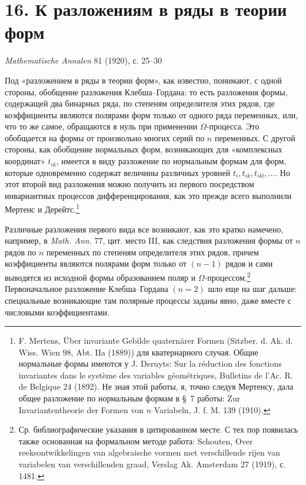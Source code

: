 \documentclass[11pt]{article}
\begin{document}

\section*{16. К разложениям в ряды в теории форм}
\begin{center}
\emph{Mathematische Annalen} 81 (1920), с. 25--30
\end{center}

Под «разложением в ряды в теории форм», как известно, понимают, с одной стороны, обобщение разложения Клебша--Гордана: то есть разложения формы, содержащей два бинарных ряда, по степеням определителя этих рядов, где коэффициенты являются полярами форм только от одного ряда переменных, или, что то же самое, обращаются в нуль при применении \(\Omega\)-процесса. Это обобщается на формы от произвольно многих серий по \(n\) переменных. С другой стороны, как обобщение нормальных форм, возникающих для «комплексных координат» \(t_{ik}\), имеется в виду разложение по нормальным формам для форм, которые одновременно содержат величины различных уровней \(t_i,t_{ik},t_{ikl},\ldots\). Но этот второй вид разложения можно получить из первого посредством инвариантных процессов дифференцирования, как это прежде всего выполнили Мертенс и Дерейтс.\footnote{F. Mertens, Über invariante Gebilde quaternärer Formen (Sitzber. d. Ak. d. Wiss. Wien 98, Abt. IIa (1889)) для кватернарного случая. Общие нормальные формы имеются у J. Deruyts: Sur la réduction des fonctions invariantes dans le système des variables géométriques, Bulletins de l'Ac. R. de Belgique 24 (1892). Не зная этой работы, я, точно следуя Мертенсу, дала общее разложение по нормальным формам в \S~7 работы: Zur Invariantentheorie der Formen von \(n\) Variabeln, J. f. M. 139 (1910).}

Различные разложения первого вида все возникают, как это кратко намечено, например, в \emph{Math. Ann.} 77, цит. место III, как следствия разложения формы от \(n\) рядов по \(n\) переменных по степеням определителя этих рядов, причем коэффициенты являются полярами форм только от \((n-1)\) рядов и сами выводятся из исходной формы образованием поляр и \(\Omega\)-процессом.\footnote{Ср. библиографические указания в цитированном месте. С тех пор появилась также основанная на формальном методе работа: Schouten, Over reeksontwikkelingen van algebraische vormen met verschillende rijen van variabelen van verschillenden graad, Verslag Ak. Amsterdam 27 (1919), с. 1481.} Первоначальное разложение Клебша--Гордана \((n=2)\) шло еще на шаг дальше: специальные возникающие там полярные процессы заданы явно, даже вместе с числовыми коэффициентами.
\end{document}
